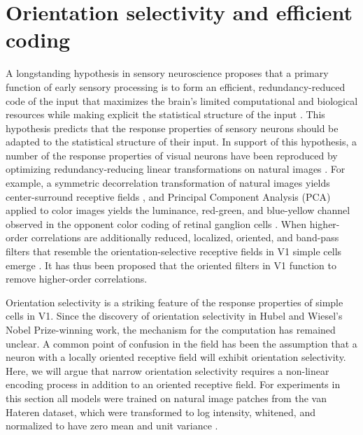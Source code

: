 \section{Orientation selectivity and efficient coding}\label{sec:ch4_selectivity_efficiency}
A longstanding hypothesis in sensory neuroscience proposes that a primary function of early sensory processing is to form an efficient, redundancy-reduced code of the input that maximizes the brain's limited computational and biological resources while making explicit the statistical structure of the input \parencite{barlow2001redundancy}.
This hypothesis predicts that the response properties of sensory neurons should be adapted to the statistical structure of their input.
In support of this hypothesis, a number of the response properties of visual neurons have been reproduced by optimizing redundancy-reducing linear transformations on natural images \parencite{atick1990towards}.
For example, a symmetric decorrelation transformation of natural images yields center-surround receptive fields \parencite{atick1990towards}, and Principal Component Analysis (PCA) applied to color images yields the luminance, red-green, and blue-yellow channel observed in the opponent color coding of retinal ganglion cells \parencite{ruderman1998statistics, buchsbaum1983trichromacy}.
When higher-order correlations are additionally reduced, localized, oriented, and band-pass filters that resemble the orientation-selective receptive fields in V1 simple cells emerge \parencite{bell1997independent, olshausen1997sparse}.
It has thus been proposed that the oriented filters in V1 function to remove higher-order correlations.

Orientation selectivity is a striking feature of the response properties of simple cells in V1.
Since the discovery of orientation selectivity in Hubel and Wiesel's Nobel Prize-winning work, the mechanism for the computation has remained unclear.
A common point of confusion in the field has been the assumption that a neuron with a locally oriented receptive field will exhibit orientation selectivity.
Here, we will argue that narrow orientation selectivity requires a non-linear encoding process in addition to an oriented receptive field.
For experiments in this section all models were trained on natural image patches from the van Hateren dataset, which were transformed to log intensity, whitened, and normalized to have zero mean and unit variance \parencite{hateren1998independent}.

